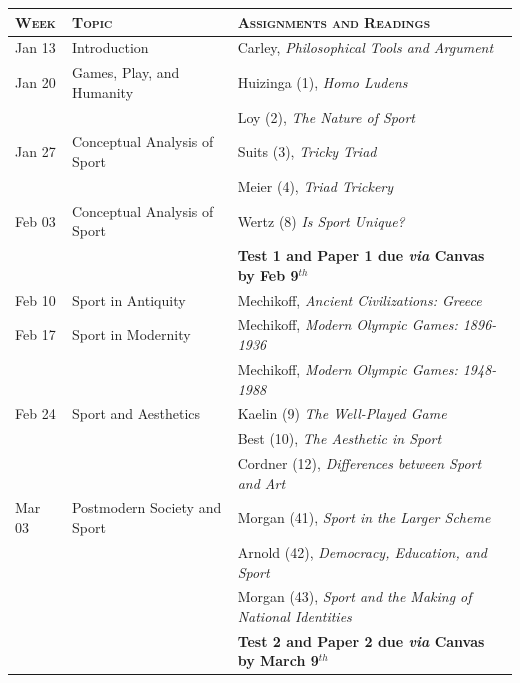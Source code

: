 \documentclass{tufte-handout}
\begin{document}
\begin{fullwidth}

\begin{center}
\begin {tabular} {l l l}
	\hline
	\rowcolor{lightblue}
	\textsc{Week} & \textsc{Topic} & \textsc{Assignments and Readings} \\
	\hline
	\rowcolor{blue}
	Jan 13 & Introduction &  Carley, \textit{Philosophical Tools and Argument} \\
	\rowcolor{lightblue}
	Jan 20 & Games, Play, and Humanity & Huizinga (1), \textit{Homo Ludens} \\
	\rowcolor{lightblue}
		& &	Loy (2), \textit{The Nature of Sport} \\
	\rowcolor{blue}
	Jan 27 & Conceptual Analysis of Sport & Suits (3), \textit{Tricky Triad} \\
	\rowcolor{blue}
		& & Meier (4), \textit{Triad Trickery} \\
	\rowcolor{lightblue}
	Feb 03 & Conceptual Analysis of Sport & Wertz (8) \textit{Is Sport Unique?} \\
	\rowcolor{lightblue}
		& & \textbf{Test 1 and Paper 1 due \textsl{via} Canvas by Feb 9$^{th}$} \\
	\rowcolor{blue}
	Feb 10 & Sport in Antiquity &   Mechikoff, \textit{Ancient Civilizations: Greece} \\
	\rowcolor{lightblue}
	Feb 17 & Sport in Modernity &   Mechikoff, \textit {Modern Olympic Games: 1896-1936} \\
	\rowcolor{lightblue}
		& & Mechikoff, \textit {Modern Olympic Games: 1948-1988} \\
	\rowcolor{blue}
	Feb 24 & Sport and Aesthetics & Kaelin (9) \textit{The Well-Played Game} \\
	\rowcolor{blue}
		& & Best (10), \textit{The Aesthetic in Sport} \\
	\rowcolor{blue}
		& & Cordner (12), \textit{Differences between Sport and Art} \\
	\rowcolor{lightblue}
	Mar 03 & Postmodern Society and Sport & Morgan (41), \textit{Sport in the Larger Scheme} \\
	\rowcolor{lightblue}
		& & Arnold (42), \textit{Democracy, Education, and Sport} \\
	\rowcolor{lightblue}
		& & Morgan (43), \textit{Sport and the Making of National Identities} \\
	\rowcolor{blue}
		& & \textbf{Test 2 and Paper 2 due \textsl{via} Canvas by March 9$^{th}$} \\

\end{tabular}
\end{center}
\end{fullwidth}
\end{document}
